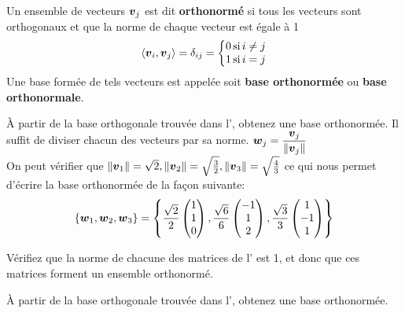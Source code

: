 \begin{defini}
Un ensemble de vecteurs $\boldsymbol{v}_j$ est dit \textbf{orthonormé} 
si tous les vecteurs
sont orthogonaux et que la norme de chaque vecteur est égale à 1
\[
\langle \boldsymbol{v}_i, \boldsymbol{v}_j \rangle = \delta_{ij} = \left\{
\begin{matrix}
0 \, \mbox{si} \, i \neq j \\
1 \, \mbox{si} \, i = j
\end{matrix}\right.
\]
Une base formée de tels vecteurs est appelée soit 
\textbf{base orthonormée} ou
\textbf{base orthonormale}.
\end{defini}
\begin{exemple}\label{ex:orthon}
À partir de la base orthogonale trouvée dans l', obtenez une base orthonormée.
\solution
Il suffit de diviser chacun des vecteurs par sa norme.
$\displaystyle \boldsymbol{w}_j = \frac{\boldsymbol{v}_j}{\lVert\boldsymbol{v}_j\rVert}  $\\
On peut vérifier que
$\lVert\boldsymbol{v}_1\rVert = \sqrt{2}, \lVert\boldsymbol{v}_2\rVert=\sqrt{\frac32}, \lVert\boldsymbol{v}_3\rVert=\sqrt{\frac43}$
ce qui nous permet d'écrire la base orthonormée de la façon suivante:
\[
\{\boldsymbol{w}_1, \boldsymbol{w}_2, \boldsymbol{w}_3\} = \left\{
\frac{\sqrt{2}}{2}\begin{pmatrix}
1 \\ 1 \\ 0
\end{pmatrix},
\frac{\sqrt{6}}{6}
\begin{pmatrix}
-1 \\ 1 \\ 2
\end{pmatrix},
\frac{\sqrt{3}}{3}
\begin{pmatrix}
1 \\ -1 \\ 1
\end{pmatrix}
\right\}
\]
\end{exemple}

\begin{exerciceB}
Vérifiez que la norme de chacune des matrices de l' est 1, et
donc que ces matrices forment un ensemble orthonormé.
\end{exerciceB}

\begin{exerciceB} \label{prob:orthog2}
À partir de la base orthogonale trouvée dans l', obtenez une base orthonormée.
\end{exerciceB}

